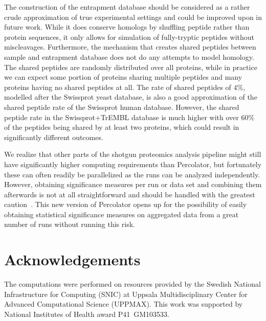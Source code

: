 \documentclass{article}
\begin{document}
The construction of the entrapment database should be considered as a 
rather crude approximation of true experimental settings and could be 
improved upon in future work. While it does conserve homologs by 
shuffling peptide rather than protein sequences, it only allows for 
simulation of fully-tryptic peptides without miscleavages. 
Furthermore, the mechanism that creates shared peptides between sample 
and entrapment database does not do any attempts to model homology. 
The shared peptides are randomly distributed over all proteins, while 
in practice we can expect some portion of proteins sharing multiple 
peptides and many proteins having no shared peptides at all. The rate 
of shared peptides of $4\%$, modelled after the Swissprot yeast 
database, is also a good approximation of the shared peptide rate of 
the Swissprot human database. However, the shared peptide rate in the 
Swissprot+TrEMBL database is much higher with over $60\%$ of the 
peptides being shared by at least two proteins, which could result in 
significantly different outcomes.

We realize that other parts of the shotgun proteomics analysis
pipeline might still have significantly higher computing requirements
than Percolator, but fortunately these can often readily be
parallelized as the runs can be analyzed independently. However,
obtaining significance measures per run or data set and combining them
afterwards is not at all straightforward and should be handled with
the greatest caution~\cite{serang2015solution}. This new version of
Percolator opens up for the possibility of easily obtaining
statistical significance measures on aggregated data from a great
number of runs without running this risk.

\section*{Acknowledgements}

The computations were performed on resources provided by the Swedish
National Infrastructure for Computing (SNIC) at Uppsala
Multidisciplinary Center for Advanced Computational Science
(UPPMAX). This work was supported by National Institutes of Health
award P41~GM103533.



\end{document}
